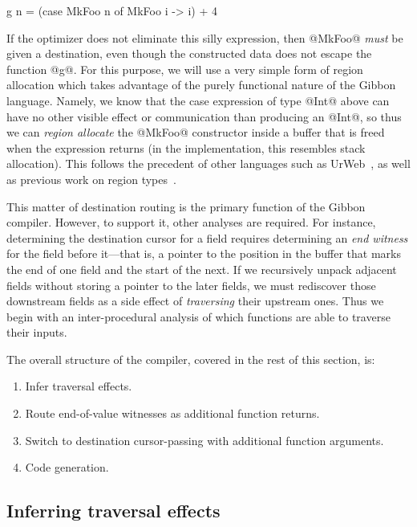 \documentclass[a4paper,english]{lipics-v2016}
\newcommand{\treelang}{Gibbon\xspace} %
\newif\ifcurly
\newcommand{\finishmecurly}{\ifcurly \Red{FINISHME - do ifcurly version here} \else}
\begin{document}
\finishmecurly
\begin{code}
  g n = (case MkFoo n of MkFoo i -> i) + 4
\end{code}
\fi

If the optimizer does not eliminate this silly expression, then @MkFoo@ {\em
  must} be given a destination, even though the constructed data does not escape
the function @g@.  For this purpose, we will use a very simple form of region
allocation which takes advantage of the purely functional nature of the
\treelang language.  Namely, we know that the case expression of type @Int@
above can have no other visible effect or communication than producing an @Int@,
so thus we can {\em region allocate} the @MkFoo@ constructor inside a buffer
that is freed when the expression returns (in the implementation, this resembles
stack allocation).  This follows the precedent of other languages such as
UrWeb~\cite{urweb}, as well as previous work on region
types~\cite{mlkit,Grossman2002}.


This matter of destination routing is the primary function of the \treelang
compiler.  However, to support it, other analyses are required.  For instance,
determining the destination cursor for a field requires determining an {\em end
  witness} for the field before it---that is, a pointer to the position in the
buffer that marks the end of one field and the start of the next.  If we
recursively unpack adjacent fields without storing a pointer to the later
fields, we must rediscover those downstream fields as a side effect of
{\em traversing} their upstream ones.  Thus we begin with an inter-procedural
analysis of which functions are able to traverse their inputs.

The overall structure of the compiler, covered in the rest of this
section, is:
\begin{enumerate}
\item Infer traversal effects.
\item Route end-of-value witnesses as additional function returns.
\item Switch to destination cursor-passing with additional function arguments.
\item Code generation.
\end{enumerate}


\subsection{Inferring traversal effects}
\end{document}
